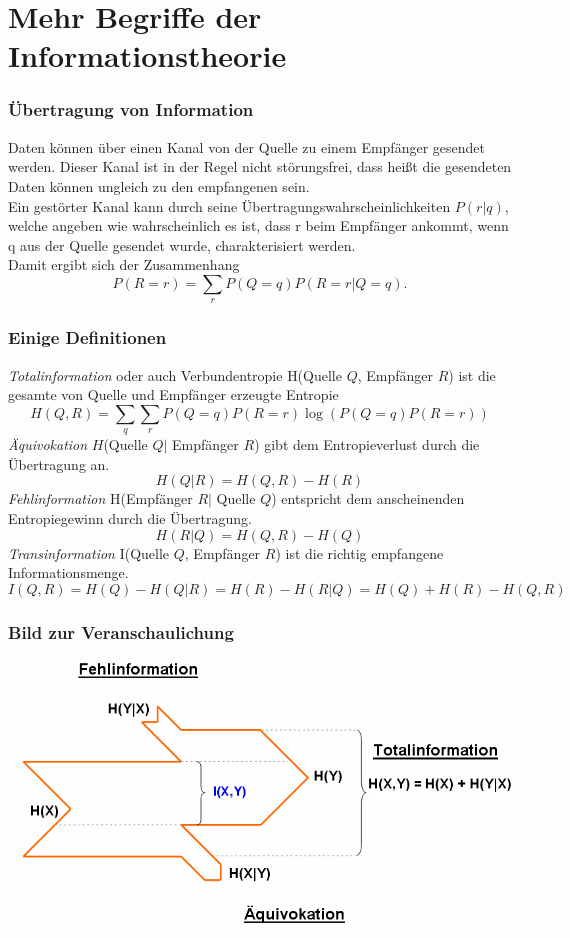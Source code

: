\section{Mehr Begriffe der Informationstheorie}
\begin{frame}
\frametitle{Übertragung von Information}
Daten können über einen Kanal von der Quelle zu einem Empfänger gesendet werden. Dieser Kanal ist in der Regel nicht störungsfrei, dass heißt die gesendeten Daten können ungleich zu den empfangenen sein.\\ 
Ein gestörter Kanal kann durch seine Übertragungswahrscheinlichkeiten $P(r|q)$, welche angeben wie wahrscheinlich es ist, dass r beim Empfänger ankommt, wenn q aus der Quelle gesendet wurde, charakterisiert werden.\\
Damit ergibt sich der Zusammenhang \[P(R=r)=\sum_{r} P(Q=q)P(R=r|Q=q).\]
\end{frame}
\begin{frame}
\frametitle{Einige Definitionen}
\emph{Totalinformation} oder auch Verbundentropie H(Quelle $Q$, Empfänger $R$) ist die gesamte von Quelle und Empfänger erzeugte Entropie
\[H(Q,R)=\sum_{q} \sum_{r} P(Q=q)P(R=r)\log(P(Q=q)P(R=r))\]
\emph{Äquivokation} $H$(Quelle $Q|$ Empfänger $R$) gibt dem Entropieverlust durch die Übertragung an.\\
\[H(Q|R)=H(Q,R)-H(R)\]
\emph{Fehlinformation} H(Empfänger $R|$ Quelle $Q$) entspricht dem anscheinenden Entropiegewinn durch die Übertragung.
\[H(R|Q)=H(Q,R)-H(Q)\]
\emph{Transinformation} I(Quelle $Q$, Empfänger $R$) ist die richtig empfangene Informationsmenge.
\[I(Q,R)= H(Q)-H(Q|R)=H(R)-H(R|Q)=H(Q)+H(R)-H(Q,R)\]
\end{frame}
\begin{frame}
\frametitle{Bild zur Veranschaulichung}
\begin{center}
\includegraphics[scale=0.35]{images/Entropie_XY}
\end{center}
\end{frame}
